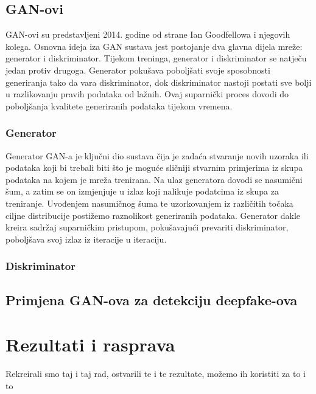 \documentclass[seminarski, times, utf8]{fer}
\begin{document}
\section{GAN-ovi}
GAN-ovi su predstavljeni 2014. godine od strane Ian Goodfellowa i njegovih kolega.
Osnovna ideja iza GAN sustava jest postojanje dva glavna dijela mreže: generator i diskriminator.
Tijekom treninga, generator i diskriminator se natječu jedan protiv drugoga. Generator pokušava poboljšati svoje sposobnosti generiranja tako da vara diskriminator, dok diskriminator nastoji postati sve bolji u razlikovanju pravih podataka od lažnih. Ovaj suparnički proces dovodi do poboljšanja kvalitete generiranih podataka tijekom vremena.
\subsection{Generator}
Generator GAN-a je ključni dio sustava čija je zadaća stvaranje novih uzoraka ili podataka koji bi trebali biti što je moguće sličniji stvarnim primjerima iz skupa podataka na kojem je mreža trenirana. 
Na ulaz generatora dovodi se nasumični šum, a zatim se on izmjenjuje u izlaz koji nalikuje podatcima iz skupa za treniranje. Uvođenjem nasumičnog šuma te uzorkovanjem iz različitih točaka ciljne distribucije postižemo raznolikost generiranih podataka.
Generator dakle kreira sadržaj suparničkim pristupom, pokušavajući prevariti diskriminator, poboljšava svoj izlaz iz iteracije u iteraciju.
\subsection{Diskriminator}

\section {Primjena GAN-ova za detekciju deepfake-ova}

\chapter{Rezultati i rasprava}
\label{pog:rezultati_i_rasprava}
Rekreirali smo taj i taj rad, ostvarili te i te rezultate, možemo ih koristiti za to i to
\end{document}
